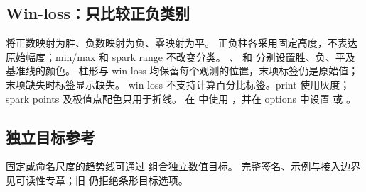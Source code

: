 \subsection{Win-loss：只比较正负类别}
 将正数映射为胜、负数映射为负、零映射为平。
正负柱各采用固定高度，不表达原始幅度；min/max 和 spark range 不改变分类。
、 和  分别设置胜、负、平及基准线的颜色。
柱形与 win-loss 均保留每个观测的位置，末项标签仍是原始值；末项缺失时标签显示缺失。
win-loss 不支持计算百分比标签。print 使用灰度；spark points 及极值点配色只用于折线。
在  中使用 ，并在 options 中设置  或 。

\subsection{独立目标参考}
固定或命名尺度的趋势线可通过 \key{\gradsparktarget} 组合独立数值目标。
完整签名、示例与接入边界见可读性专章；旧 \key{\gradspark} 仍拒绝条形目标选项。
